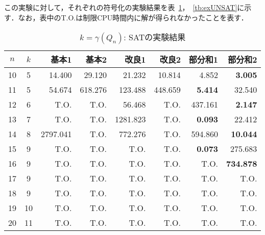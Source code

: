 この実験に対して，それぞれの符号化の実験結果を表~\ref{tb:exSAT}，~\ref{tb:exUNSAT}に示す．なお，表中のT.O.は制限CPU時間内に解が得られなかったことを表す．
\begin{table}[ht]
 \caption{$k=\gamma(Q_n)$: SATの実験結果}
 \label{tb:exSAT}
 \centering
 \begin{tabular}{c|c|r|r|r|r|r|r} \hline
  $n$ & $k$ & 基本1 & 基本2 & 改良1 & 改良2 & 部分和1 & 部分和2 \\ \hline
  10 & 5 & 14.400 & 29.120 & 21.232 & 10.814 & 4.852 & \textbf{3.005} \\
  11 & 5 & 54.674 & 618.276 & 123.488 & 448.659 & \textbf{5.414} & 32.540 \\
  12 & 6 & T.O. & T.O. & 56.468 & T.O. & 437.161 & \textbf{2.147} \\
  13 & 7 & T.O. & T.O. & 1281.823 & T.O. & \textbf{0.093} & 22.412 \\
  14 & 8 & 2797.041 & T.O. & 772.276 & T.O. & 594.860 & \textbf{10.044}\\
  15 & 9 & T.O. & T.O. & T.O. & T.O. & \textbf{0.073} & 275.683 \\
  16 & 9 & T.O. & T.O. & T.O. & T.O. & T.O. & \textbf{734.878} \\
  17 & 9 & T.O. & T.O. & T.O. & T.O. & T.O. & T.O. \\
  18 & 9 & T.O. & T.O. & T.O. & T.O. & T.O. & T.O. \\
  19 & 10 & T.O. & T.O. & T.O. & T.O. & T.O. & T.O. \\
  20 & 11 & T.O. & T.O. & T.O. & T.O. & T.O. & T.O. \\ \hline
 \end{tabular}
\end{table}


